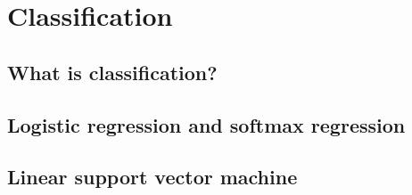 \section{Classification}

\subsection{What is classification?}

\subsection{Logistic regression and softmax regression}

\subsection{Linear support vector machine}